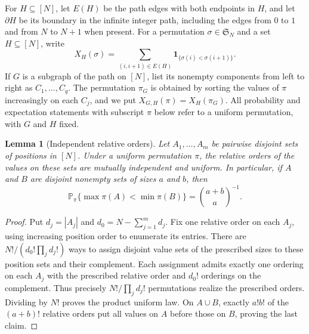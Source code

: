 \documentclass[11pt]{article}
\numberwithin{equation}{section}
\newtheorem{lemma}[theorem]{Lemma}
\theoremstyle{definition}
\theoremstyle{remark}
\newcommand{\Pp}{\mathbb P}
\newcommand{\1}{\mathbf 1}
\begin{document}
For $H\subseteq[N]$, let $E(H)$ be the path edges with both endpoints in $H$, and let $\partial H$ be its boundary in the infinite integer path, including the edges from $0$ to $1$ and from $N$ to $N+1$ when present. For a permutation \(\sigma\in\mathfrak S_N\) and a set \(H\subseteq[N]\),
write
\[
  X_H(\sigma)=\sum_{(i,i+1)\in E(H)}
                 \mathbf 1_{\{\sigma(i)<\sigma(i+1)\}}.
\]
If \(G\) is a subgraph of the path on \([N]\), list its nonempty
components from left to right as \(C_1,\ldots,C_q\).  The permutation
\(\pi_G\) is obtained by sorting the values of \(\pi\) increasingly
on each \(C_j\), and we put \(X_{G,H}(\pi)=X_H(\pi_G)\).
All probability and expectation statements with subscript \(\pi\) below
refer to a uniform permutation, with \(G\) and \(H\) fixed.

\begin{lemma}[Independent relative orders]
\label{lem:relative-order-independence}
Let \(A_1,\ldots,A_m\) be pairwise disjoint sets of positions in
\([N]\).  Under a uniform permutation \(\pi\), the relative orders of
the values on these sets are mutually independent and uniform.  In
particular, if \(A\) and \(B\) are disjoint nonempty sets of sizes
\(a\) and \(b\), then
\[
  \Pp_\pi\{\max\pi(A)<\min\pi(B)\}
  =\binom{a+b}{a}^{-1}.
\]
\end{lemma}

\begin{proof}
Put \(d_j=|A_j|\) and \(d_0=N-\sum_{j=1}^m d_j\).  Fix one
relative order on each \(A_j\), using increasing position order to
enumerate its entries.  There are
\(N!/(d_0!\prod_jd_j!)\) ways to assign disjoint value sets of the
prescribed sizes to these position sets and their complement.  Each
assignment admits exactly one ordering on each \(A_j\) with the
prescribed relative order and \(d_0!\) orderings on the complement.
Thus precisely \(N!/\prod_jd_j!\) permutations realize the prescribed
orders.  Dividing by \(N!\) proves the product uniform law.  On
\(A\cup B\), exactly \(a!b!\) of the \((a+b)!\) relative orders
put all values on \(A\) before those on \(B\), proving the last claim.
\end{proof}
\end{document}
